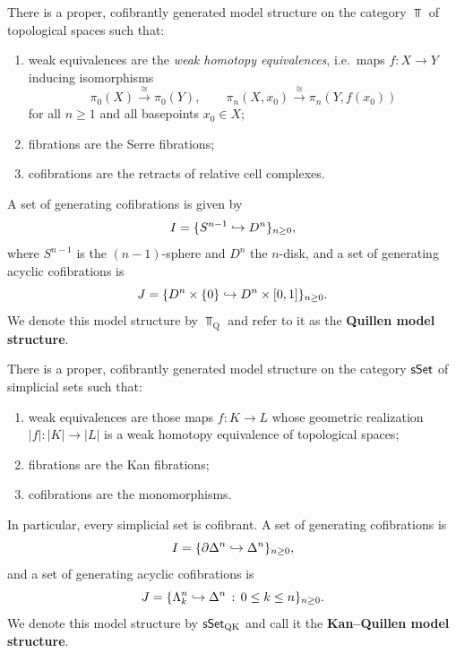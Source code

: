 \begin{theorem}
  \label{ch2:: thm: Quillen model structure}
  There is a proper, cofibrantly generated model structure on the category
  $\Top$ of topological spaces such that:
  \begin{enumerate}
    \item weak equivalences are the \emph{weak homotopy equivalences}, i.e.\
      maps $f\colon X \to Y$ inducing isomorphisms
      \begin{equation}
        \pi_0(X) \xrightarrow{\;\cong\;} \pi_0(Y),
        \qquad
        \pi_n(X,x_0) \xrightarrow{\;\cong\;} \pi_n(Y,f(x_0))
      \end{equation}
      for all $n\geq 1$ and all basepoints $x_0\in X$;
    \item fibrations are the Serre fibrations;
    \item cofibrations are the retracts of relative cell complexes.
  \end{enumerate}
  A set of generating cofibrations is given by
  \begin{equation}
    I = \{S^{n-1} \hookrightarrow D^{n}\}_{n\geq 0},
  \end{equation}
  where $S^{n-1}$ is the $(n-1)$-sphere and $D^n$ the $n$-disk, and a set of
  generating acyclic cofibrations is
  \begin{equation}
    J = \{D^{n}\times \{0\} \hookrightarrow D^{n} \times [0,1]\}_{n \geq 0}.
  \end{equation}
  We denote this model structure by $\Top_{\mathrm Q}$ and refer to it as the
  \textbf{Quillen model structure}.
\end{theorem}

\begin{theorem}
  \label{ch2:: thm: Kan-quillen model}
  There is a proper, cofibrantly generated model structure on the category
  $\operatorname{\sf sSet}$ of simplicial sets such that:
  \begin{enumerate}
    \item weak equivalences are those maps $f\colon K \to L$ whose geometric
      realization $|f|\colon |K| \to |L|$ is a weak homotopy equivalence of
      topological spaces;
    \item fibrations are the Kan fibrations;
    \item cofibrations are the monomorphisms.
  \end{enumerate}
  In particular, every simplicial set is cofibrant.  A set of generating
  cofibrations is
  \begin{equation}
    I = \{\partial \Delta^n \hookrightarrow \Delta^{n}\}_{n\geq 0},
  \end{equation}
  and a set of generating acyclic cofibrations is
  \begin{equation}
    J = \{\Lambda^{n}_{k} \hookrightarrow \Delta^{n}\,:\, 0 \leq k \leq n\}_{n \geq 0}.
  \end{equation}
  We denote this model structure by $\operatorname{\sf sSet}_{\mathrm{QK}}$ and call it the
  \textbf{Kan--Quillen model structure}.
\end{theorem}

